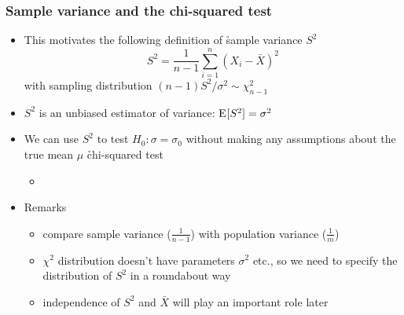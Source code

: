 \documentclass[handout,notes=show,t]{beamer} %
\begin{document}
\begin{frame}
  \frametitle{Sample variance and the chi-squared test}

  \begin{itemize}
  \item This motivates the following definition of \h{sample variance} $S^2$
    \[
    S^2 = \frac{1}{n-1} \sum_{i=1}^n (X_i - \bar{X})^2
    \]
    with sampling distribution $(n-1) S^2 / \sigma^2 \sim \chi^2_{n-1}$
  \item $S^2$ is an unbiased estimator of variance: $\mathrm{E}_{}[S^2] = \sigma^2$
  \item We can use $S^2$ to test $H_0: \sigma = \sigma_0$ without making any
    assumptions about the true mean $\mu$ \so \h{chi-squared test}
    \begin{itemize}
    \item[]
    \end{itemize}
  \item Remarks
    \begin{itemize}
    \item compare sample variance ($\frac{1}{n-1}$) with population variance ($\frac{1}{m}$)
    \item $\chi^2$ distribution doesn't have parameters $\sigma^2$ etc., so we
      need to specify the distribution of $S^2$ in a roundabout way
    \item independence of $S^2$ and $\bar{X}$ will play an important role later
    \end{itemize}
  \end{itemize}
\end{frame}

\end{document}

